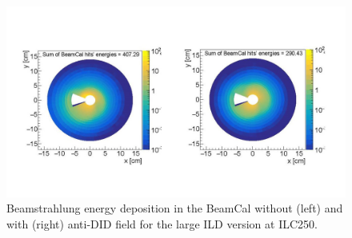 \begin{figure}[t!]
\includegraphics[width=1.0\hsize]{Integration/fig/BG_beamcal.jpg}
\caption{\label{fig:integration:beamcal}Beamstrahlung energy deposition in the BeamCal without (left) and with (right) anti-DID field for the large ILD version at ILC250. }
\end{figure}

